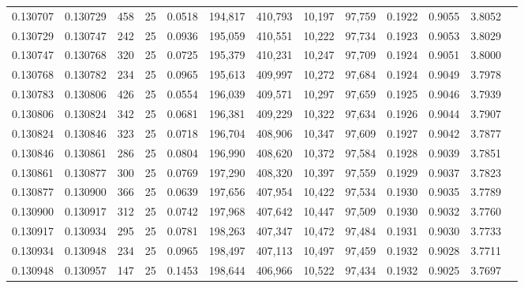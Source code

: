 \begin{tabular}{rrrrrrrrrrrrr}
0.130707 & 0.130729 &   458 &  25 &                                     0.0518 & 194,817 & 410,793 &  10,197 &  97,759 & 0.1922 & 0.9055 & 3.8052 \\
0.130729 & 0.130747 &   242 &  25 &                                     0.0936 & 195,059 & 410,551 &  10,222 &  97,734 & 0.1923 & 0.9053 & 3.8029 \\
0.130747 & 0.130768 &   320 &  25 &                                     0.0725 & 195,379 & 410,231 &  10,247 &  97,709 & 0.1924 & 0.9051 & 3.8000 \\
0.130768 & 0.130782 &   234 &  25 &                                     0.0965 & 195,613 & 409,997 &  10,272 &  97,684 & 0.1924 & 0.9049 & 3.7978 \\
0.130783 & 0.130806 &   426 &  25 &                                     0.0554 & 196,039 & 409,571 &  10,297 &  97,659 & 0.1925 & 0.9046 & 3.7939 \\
0.130806 & 0.130824 &   342 &  25 &                                     0.0681 & 196,381 & 409,229 &  10,322 &  97,634 & 0.1926 & 0.9044 & 3.7907 \\
0.130824 & 0.130846 &   323 &  25 &                                     0.0718 & 196,704 & 408,906 &  10,347 &  97,609 & 0.1927 & 0.9042 & 3.7877 \\
0.130846 & 0.130861 &   286 &  25 &                                     0.0804 & 196,990 & 408,620 &  10,372 &  97,584 & 0.1928 & 0.9039 & 3.7851 \\
0.130861 & 0.130877 &   300 &  25 &                                     0.0769 & 197,290 & 408,320 &  10,397 &  97,559 & 0.1929 & 0.9037 & 3.7823 \\
0.130877 & 0.130900 &   366 &  25 &                                     0.0639 & 197,656 & 407,954 &  10,422 &  97,534 & 0.1930 & 0.9035 & 3.7789 \\
0.130900 & 0.130917 &   312 &  25 &                                     0.0742 & 197,968 & 407,642 &  10,447 &  97,509 & 0.1930 & 0.9032 & 3.7760 \\
0.130917 & 0.130934 &   295 &  25 &                                     0.0781 & 198,263 & 407,347 &  10,472 &  97,484 & 0.1931 & 0.9030 & 3.7733 \\
0.130934 & 0.130948 &   234 &  25 &                                     0.0965 & 198,497 & 407,113 &  10,497 &  97,459 & 0.1932 & 0.9028 & 3.7711 \\
0.130948 & 0.130957 &   147 &  25 &                                     0.1453 & 198,644 & 406,966 &  10,522 &  97,434 & 0.1932 & 0.9025 & 3.7697 \\

\end{tabular}
